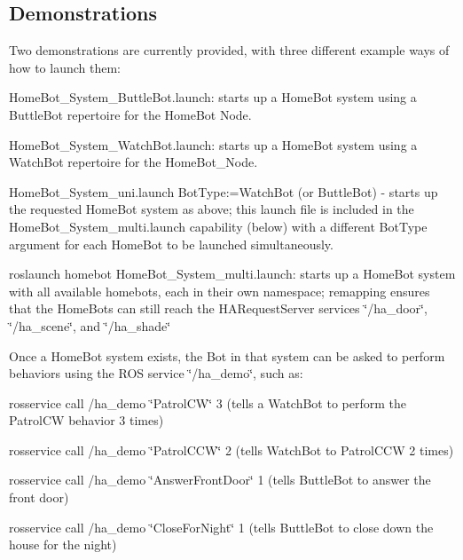 \subsection*{Demonstrations}

Two demonstrations are currently provided, with three different example ways of how to launch them\-:


\begin{DoxyItemize}
\item Home\-Bot\-\_\-\-System\-\_\-\-Buttle\-Bot.\-launch\-: starts up a Home\-Bot system using a Buttle\-Bot repertoire for the Home\-Bot Node.
\item Home\-Bot\-\_\-\-System\-\_\-\-Watch\-Bot.\-launch\-: starts up a Home\-Bot system using a Watch\-Bot repertoire for the Home\-Bot\-\_\-\-Node.
\item Home\-Bot\-\_\-\-System\-\_\-uni.\-launch Bot\-Type\-:=Watch\-Bot (or Buttle\-Bot) -\/ starts up the requested Home\-Bot system as above; this launch file is included in the Home\-Bot\-\_\-\-System\-\_\-multi.\-launch capability (below) with a different Bot\-Type argument for each Home\-Bot to be launched simultaneously.
\item roslaunch homebot Home\-Bot\-\_\-\-System\-\_\-multi.\-launch\-: starts up a Home\-Bot system with all available homebots, each in their own namespace; remapping ensures that the Home\-Bots can still reach the H\-A\-Request\-Server services \char`\"{}/ha\-\_\-door\char`\"{}, \char`\"{}/ha\-\_\-scene\char`\"{}, and \char`\"{}/ha\-\_\-shade\char`\"{}
\end{DoxyItemize}

Once a Home\-Bot system exists, the Bot in that system can be asked to perform behaviors using the R\-O\-S service \char`\"{}/ha\-\_\-demo\char`\"{}, such as\-:


\begin{DoxyItemize}
\item rosservice call /ha\-\_\-demo \char`\"{}\-Patrol\-C\-W\char`\"{} 3 (tells a Watch\-Bot to perform the Patrol\-C\-W behavior 3 times)
\item rosservice call /ha\-\_\-demo \char`\"{}\-Patrol\-C\-C\-W\char`\"{} 2 (tells Watch\-Bot to Patrol\-C\-C\-W 2 times)
\item rosservice call /ha\-\_\-demo \char`\"{}\-Answer\-Front\-Door\char`\"{} 1 (tells Buttle\-Bot to answer the front door)
\item rosservice call /ha\-\_\-demo \char`\"{}\-Close\-For\-Night\char`\"{} 1 (tells Buttle\-Bot to close down the house for the night)
\end{DoxyItemize}


